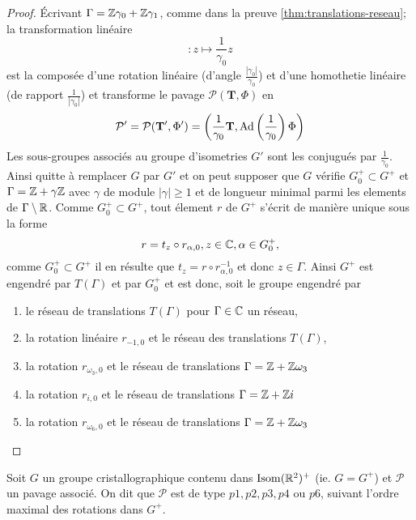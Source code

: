 \begin{proof}
	Écrivant $\Gamma = \mathbb{Z}\gamma_0 +\mathbb{Z}\gamma_1$, comme dans la preuve
	\ref{thm:translations-reseau};
	la transformation linéaire
	\begin{equation}
		[\times \frac{1}{\gamma_0}]: z \mapsto \frac{1}{\gamma_0} z
	\end{equation}
	est la composée d'une rotation linéaire (d'angle
	$\frac{|\gamma_0|}{\gamma_0}$) et d'une homothetie linéaire (de rapport 
	$\frac{1}{|\gamma_0|}$) et transforme le pavage
	$\mathcal{P}(\mathbf{T}, \Phi)$ en
	\begin{equation*}
		\mathcal{P}' = \mathcal{P}(\mathbf{T}', \Phi') =
		\left(\frac{1}{\gamma_0}\mathbf{T},
		\operatorname{Ad}\left(\frac{1}{\gamma_0}\right)\Phi\right)
	\end{equation*}
	Les sous-groupes associés au groupe d'isometries $G'$ sont les conjugués par
	$\frac{1}{\gamma_0}$. Ainsi quitte à remplacer $G$ par $G'$ et on peut
	supposer que $G$ vérifie $G_0^+ \subset G^+$ et $\Gamma=\mathbb{Z} + \gamma\mathbb{Z}$ avec
	$\gamma$ de module $|\gamma| \geq 1$ et de longueur minimal parmi les
	elements de $\Gamma \setminus \mathbb{R}$. Comme $G_0^+ \subset G^+$, tout élement
	$r$ de $G^+$ s'écrit de manière unique sous la forme
	\begin{equation*}
		r = t_z \circ r_{\alpha, 0}, z\in\mathbb{C}, \alpha \in G_0^+,
	\end{equation*}
	comme $G_0^+ \subset G^+$ il en résulte que
	$t_z = r \circ r_{\alpha, 0}^{-1}$ et donc $z \in \Gamma$.
	Ainsi $G^+$ est engendré par $T(\Gamma)$ et par $G_0^+$ et est donc, soit le
	groupe engendré par
	\begin{enumerate}
		\item le réseau de translations $T(\Gamma)$ pour $\Gamma \in \mathbb{C}$ un
			réseau,
		\item la rotation linéaire $r_{-1, 0}$ et le
			réseau des translations $T(\Gamma)$,
		\item la rotation $r_{\omega_3, 0}$ et le réseau de translations
			$\Gamma = \mathbb{Z} + \mathbb{Z}\omega_3$
		\item la rotation $r_{i, 0}$ et le réseau de translations
			$\Gamma = \mathbb{Z} + \mathbb{Z} i$
		\item la rotation $r_{\omega_6, 0}$ et le réseau de translations
			$\Gamma = \mathbb{Z} + \mathbb{Z}\omega_3$
	\end{enumerate}
\end{proof}

\begin{definition}
	Soit $G$ un groupe cristallographique contenu dans $\operatorname{Isom}(\mathbb{R}^2)^+$
	(ie. $G = G^+$) et $\mathcal{P}$ un pavage associé.
	On dit que $\mathcal{P}$ est de type $p1, p2, p3, p4$ ou $p6$, suivant
	l'ordre maximal des rotations dans $G^+$.
\end{definition}


